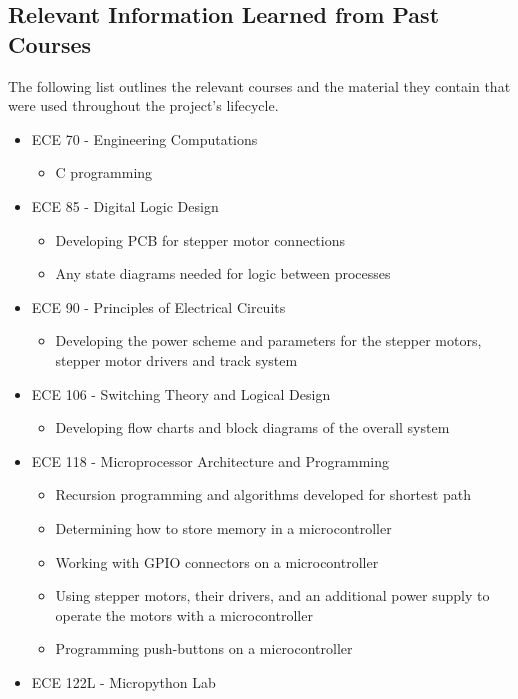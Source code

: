 \subsection{Relevant Information Learned from Past Courses}
The following list outlines the relevant courses and the material they contain that were used throughout the project's lifecycle.\par
\begin{itemize}
\item ECE 70 - Engineering Computations
	\begin{itemize}
		\item C programming 
	\end{itemize}
\item ECE 85 - Digital Logic Design 
	\begin{itemize}
		\item Developing PCB for stepper motor connections
		\item Any state diagrams needed for logic between processes
	\end{itemize}
\item ECE 90 - Principles of Electrical Circuits
	\begin{itemize}
		\item Developing the power scheme and parameters for the stepper motors, stepper motor drivers and track system
	\end{itemize}
\item ECE 106 - Switching Theory and Logical Design
	\begin{itemize}
		\item Developing flow charts and block diagrams of the overall system
	\end{itemize}
\item ECE 118 - Microprocessor Architecture and Programming
	\begin{itemize}
		\item Recursion programming and algorithms developed for shortest path
		\item Determining how to store memory in a microcontroller
		\item Working with GPIO connectors on a microcontroller
		\item Using stepper motors, their drivers, and an additional power supply to operate the motors with a microcontroller
		\item Programming push-buttons on a microcontroller
	\end{itemize}	
\item ECE 122L - Micropython Lab

\end{itemize}
